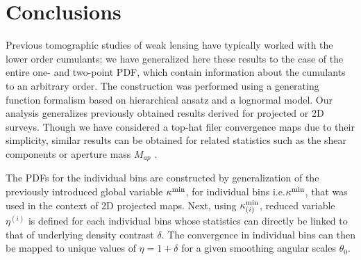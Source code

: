 \documentclass[usenatbib]{mn2e}
\begin{document}
\section{Conclusions}
\label{sec:conclu}
%
%
Previous tomographic studies of weak lensing have typically worked with 
the lower order cumulants; we have generalized here these
results to the case of the entire one- and two-point PDF, which contain 
information about the cumulants to an arbitrary order.
The construction was performed using a generating function formalism
based on hierarchical ansatz and a lognormal model. Our analysis generalizes previously
obtained results derived for projected or 2D surveys. Though 
we have considered a top-hat filer convergence maps due to their simplicity, similar results
can be obtained for related statistics such as the shear components or aperture mass $M_{ap}$ \citep{BV00}.
%
%

The PDFs for the individual bins are constructed by generalization of the 
previously introduced global variable $\kappa^{\rm min}$, for individual bins i.e.$\kappa^{\rm min}$,  
that was used in the context of 2D projected maps.
Next, using $\kappa_{(i)}^{\rm min}$,  reduced variable $\eta^{(i)}$ is defined for 
each individual bins whose statistics can directly be linked 
to that of underlying density contrast $\delta$. The convergence in individual bins
can then be mapped to unique values of $\eta=1+\delta$ for a given smoothing angular scales $\theta_0$.
%
\end{document}

